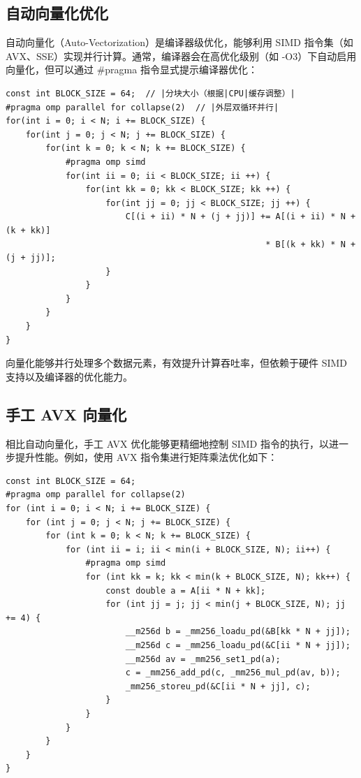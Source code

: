 \documentclass[a4paper, utf8]{ctexart}
\begin{document}
	\subsection{自动向量化优化}
	
	自动向量化（Auto-Vectorization）是编译器级优化，能够利用 SIMD 指令集（如 AVX、SSE）实现并行计算。通常，编译器会在高优化级别（如 -O3）下自动启用向量化，但可以通过 \#pragma 指令显式提示编译器优化：
	
	\begin{verbatim}
const int BLOCK_SIZE = 64;  // |分块大小（根据|CPU|缓存调整）|
#pragma omp parallel for collapse(2)  // |外层双循环并行|
for(int i = 0; i < N; i += BLOCK_SIZE) {
    for(int j = 0; j < N; j += BLOCK_SIZE) {
        for(int k = 0; k < N; k += BLOCK_SIZE) {
            #pragma omp simd
            for(int ii = 0; ii < BLOCK_SIZE; ii ++) {
                for(int kk = 0; kk < BLOCK_SIZE; kk ++) {
                    for(int jj = 0; jj < BLOCK_SIZE; jj ++) {
                        C[(i + ii) * N + (j + jj)] += A[(i + ii) * N + (k + kk)]
                                                    * B[(k + kk) * N + (j + jj)];
                    }
                }
            }
        }
    }
}
	\end{verbatim}
	
	向量化能够并行处理多个数据元素，有效提升计算吞吐率，但依赖于硬件 SIMD 支持以及编译器的优化能力。
	
	\subsection{手工 AVX 向量化}
	
	相比自动向量化，手工 AVX 优化能够更精细地控制 SIMD 指令的执行，以进一步提升性能。例如，使用 AVX 指令集进行矩阵乘法优化如下：
	
	\begin{verbatim}
const int BLOCK_SIZE = 64;
#pragma omp parallel for collapse(2)
for (int i = 0; i < N; i += BLOCK_SIZE) {
    for (int j = 0; j < N; j += BLOCK_SIZE) {
        for (int k = 0; k < N; k += BLOCK_SIZE) {
            for (int ii = i; ii < min(i + BLOCK_SIZE, N); ii++) {
                #pragma omp simd
                for (int kk = k; kk < min(k + BLOCK_SIZE, N); kk++) {
                    const double a = A[ii * N + kk];
                    for (int jj = j; jj < min(j + BLOCK_SIZE, N); jj += 4) {
                        __m256d b = _mm256_loadu_pd(&B[kk * N + jj]);
                        __m256d c = _mm256_loadu_pd(&C[ii * N + jj]);
                        __m256d av = _mm256_set1_pd(a);
                        c = _mm256_add_pd(c, _mm256_mul_pd(av, b));
                        _mm256_storeu_pd(&C[ii * N + jj], c);
                    }
                }
            }
        }
    }
}
	\end{verbatim}
	
\end{document}
